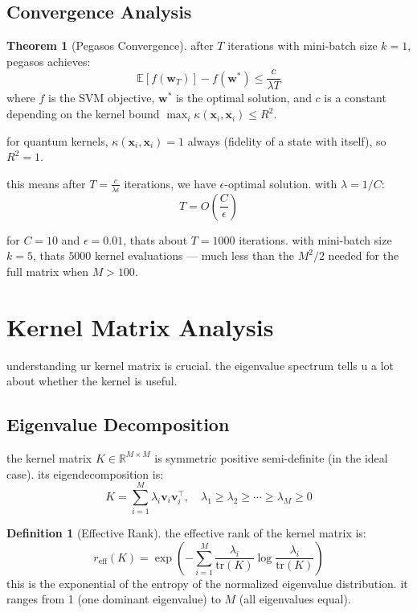 \documentclass[11pt,a4paper]{article}
\theoremstyle{definition}
\newtheorem{definition}{Definition}[section]
\newtheorem{theorem}{Theorem}[section]
\theoremstyle{remark}
\begin{document}
\subsection{Convergence Analysis}

\begin{theorem}[Pegasos Convergence]
after $T$ iterations with mini-batch size $k = 1$, pegasos achieves:
\[
\mathbb{E}[f(\mathbf{w}_T)] - f(\mathbf{w}^*) \leq \frac{c}{\lambda T}
\]
where $f$ is the SVM objective, $\mathbf{w}^*$ is the optimal solution, and $c$ is a constant depending on the kernel bound $\max_i \kappa(\mathbf{x}_i, \mathbf{x}_i) \leq R^2$.

for quantum kernels, $\kappa(\mathbf{x}_i, \mathbf{x}_i) = 1$ always (fidelity of a state with itself), so $R^2 = 1$.
\end{theorem}

this means after $T = \frac{c}{\lambda \epsilon}$ iterations, we have $\epsilon$-optimal solution. with $\lambda = 1/C$:
\[
T = O\!\left(\frac{C}{\epsilon}\right)
\]

for $C = 10$ and $\epsilon = 0.01$, thats about $T = 1000$ iterations. with mini-batch size $k = 5$, thats $5000$ kernel evaluations --- much less than the $M^2/2$ needed for the full matrix when $M > 100$.

\section{Kernel Matrix Analysis}

understanding ur kernel matrix is crucial. the eigenvalue spectrum tells u a lot about whether the kernel is useful.

\subsection{Eigenvalue Decomposition}

the kernel matrix $K \in \mathbb{R}^{M \times M}$ is symmetric positive semi-definite (in the ideal case). its eigendecomposition is:
\[
K = \sum_{i=1}^M \lambda_i \mathbf{v}_i \mathbf{v}_i^\top, \quad \lambda_1 \geq \lambda_2 \geq \cdots \geq \lambda_M \geq 0
\]

\begin{definition}[Effective Rank]
the effective rank of the kernel matrix is:
\[
r_{\text{eff}}(K) = \exp\!\left(-\sum_{i=1}^M \frac{\lambda_i}{\text{tr}(K)} \log \frac{\lambda_i}{\text{tr}(K)}\right)
\]
this is the exponential of the entropy of the normalized eigenvalue distribution. it ranges from 1 (one dominant eigenvalue) to $M$ (all eigenvalues equal).
\end{definition}
\end{document}

